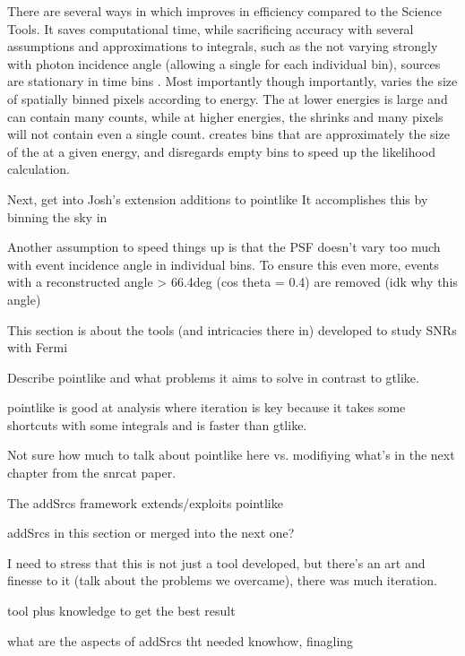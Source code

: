 {There are several ways in which \ptlike{} improves in efficiency compared to the Science Tools. It saves computational time, while  sacrificing accuracy
with several assumptions and approximations to integrals, such as the \psf{} not varying strongly with photon incidence angle (allowing a single \psf{} for each individual bin), sources are stationary in time bins . Most importantly though importantly, \ptlike{} varies the size of spatially binned \heal{} pixels \citep{Gorski05} according to energy. The \psf{} at lower energies is large and can contain many counts, while at higher energies, the \psf{} shrinks and many pixels will not contain even a single count. \ptlike{} creates \heal{} bins that are approximately the size of the \psf{} at a given energy, and disregards empty bins to speed up the likelihood calculation.


Next, get into Josh's extension additions to pointlike
It accomplishes this by binning the sky in  


Another assumption to speed things up is that the PSF doesn't vary too much with event incidence angle in individual bins. To ensure this even more, events with a reconstructed angle > 66.4deg (cos theta = 0.4) are removed (idk why this angle)

This section is about the tools (and intricacies there in) developed to study SNRs with Fermi

Describe pointlike and what problems it aims to solve in contrast to gtlike.

pointlike is good at analysis where iteration is key because it takes some shortcuts with some integrals and is faster than gtlike. 

Not sure how much to talk about pointlike here vs. modifiying what's in the next chapter from the snrcat paper. 

The addSrcs framework extends/exploits pointlike 

addSrcs in this section or merged into the next one?

I need to stress that this is not just a tool developed, but there's an art and finesse to it (talk about the problems we overcame), there was much iteration.

tool plus knowledge to get the best result

what are the aspects of addSrcs tht needed knowhow, finagling


}
